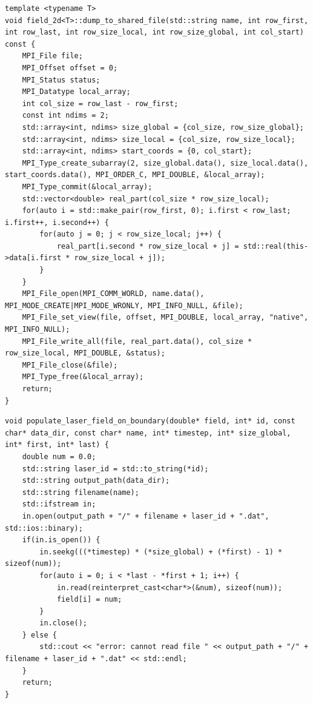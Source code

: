 \begin{lstlisting}[style=CXX, caption=Method for dumping data into shared file]
template <typename T>
void field_2d<T>::dump_to_shared_file(std::string name, int row_first, int row_last, int row_size_local, int row_size_global, int col_start) const {
	MPI_File file;
	MPI_Offset offset = 0;
	MPI_Status status;
	MPI_Datatype local_array;
	int col_size = row_last - row_first;
	const int ndims = 2;
	std::array<int, ndims> size_global = {col_size, row_size_global};
	std::array<int, ndims> size_local = {col_size, row_size_local};
	std::array<int, ndims> start_coords = {0, col_start};
	MPI_Type_create_subarray(2, size_global.data(), size_local.data(), start_coords.data(), MPI_ORDER_C, MPI_DOUBLE, &local_array);
	MPI_Type_commit(&local_array);
	std::vector<double> real_part(col_size * row_size_local);
	for(auto i = std::make_pair(row_first, 0); i.first < row_last; i.first++, i.second++) {
		for(auto j = 0; j < row_size_local; j++) {
			real_part[i.second * row_size_local + j] = std::real(this->data[i.first * row_size_local + j]);
		}
	}
	MPI_File_open(MPI_COMM_WORLD, name.data(), MPI_MODE_CREATE|MPI_MODE_WRONLY, MPI_INFO_NULL, &file);
	MPI_File_set_view(file, offset, MPI_DOUBLE, local_array, "native", MPI_INFO_NULL);
	MPI_File_write_all(file, real_part.data(), col_size * row_size_local, MPI_DOUBLE, &status);
	MPI_File_close(&file);
	MPI_Type_free(&local_array);
	return;
}
\end{lstlisting}

\begin{lstlisting}[style=CXX, caption=Extern C++ function to fill Fortran arrays with laser fields dumped in binary file]
void populate_laser_field_on_boundary(double* field, int* id, const char* data_dir, const char* name, int* timestep, int* size_global, int* first, int* last) {
	double num = 0.0;
	std::string laser_id = std::to_string(*id);
	std::string output_path(data_dir);
	std::string filename(name);
	std::ifstream in;
	in.open(output_path + "/" + filename + laser_id + ".dat", std::ios::binary);
	if(in.is_open()) {
		in.seekg(((*timestep) * (*size_global) + (*first) - 1) * sizeof(num));
		for(auto i = 0; i < *last - *first + 1; i++) {
			in.read(reinterpret_cast<char*>(&num), sizeof(num));
			field[i] = num;
		}
		in.close();
	} else {
		std::cout << "error: cannot read file " << output_path + "/" + filename + laser_id + ".dat" << std::endl;
	}
	return;
}
\end{lstlisting}

